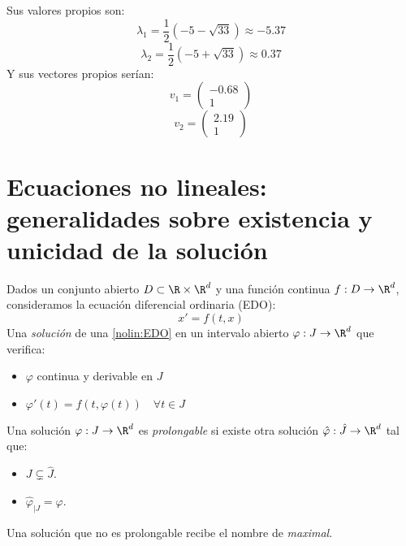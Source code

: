 \begin{sol}
Sus valores propios son:
$$\lambda_1=\frac{1}{2}(-5-\sqrt{33})\approx -5.37$$
$$\lambda_2=\frac{1}{2}(-5+\sqrt{33})\approx 0.37$$
Y sus vectores propios serían:
$$v_1=\begin{pmatrix}-0.68 \\ 1 \end{pmatrix} $$
$$v_2=\begin{pmatrix}2.19 \\ 1 \end{pmatrix} $$
\end{sol}


\section{Ecuaciones no lineales: generalidades sobre existencia y unicidad de la solución}

\begin{ndef}
Dados un conjunto abierto $D \subset \R \times \R^d$ y una función continua $f:D\to \R^d$, consideramos la ecuación diferencial ordinaria (EDO):
\begin{equation}
x'=f(t,x) \tag{EDO}\label{nolin:EDO}
\end{equation}
Una \emph{solución} de una \ref{nolin:EDO} en un intervalo abierto $\varphi:J\to\R^d$ que verifica:
\begin{itemize}
\item $\varphi$ continua y derivable en $J$
\item $\varphi'(t)=f(t,\varphi(t)) \quad \forall t \in J$
\end{itemize}
\end{ndef}

\begin{ndef}
Una solución $\varphi : J \to \R^d$ es \emph{prolongable} si existe otra solución $\hat{\varphi} : \hat{J}\to\R^d$ tal que:
\begin{itemize}
\item $J\subsetneq \hat{J}$.
\item $\hat{\varphi}_{|J} = \varphi$.
\end{itemize}
\end{ndef}

\begin{ndef}
Una solución que no es prolongable recibe el nombre de \emph{maximal}.
\end{ndef}

